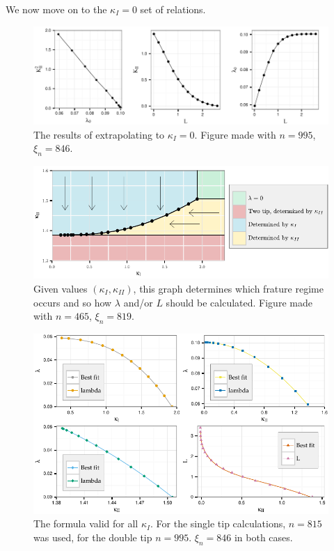 \documentclass{jfm}
\begin{document}
We now move on to the $\kappa_I=0$ set of relations.
\begin{figure}
 \centerline{
\includegraphics{./../../Graphs/KI-0.pdf}}
  \caption{The results of extrapolating to $\kappa_I = 0$. Figure 
           made with $n = 995$, $\xi_n = 846$.}
\end{figure}


\begin{figure}
 \centerline{
\includegraphics{./../../Graphs/catagory-edited.pdf}}
  \caption{Given values $(\kappa_I,\kappa_{II})$, this graph determines which
           frature regime occurs and so how $\lambda$ and/or $L$ should be 
           calculated. Figure made with $n=465$, $\xi_n = 819$.}
\end{figure}

\begin{figure}
 \centerline{
\includegraphics{./../../Graphs/overall-fit.pdf}}
  \caption{The formula valid for all $\kappa_I$. For the single tip 
           calculations, $n=815$ was used, for the double tip $n=995$. 
           $\xi_n = 846$ in both cases.  }
\end{figure}
\end{document}
